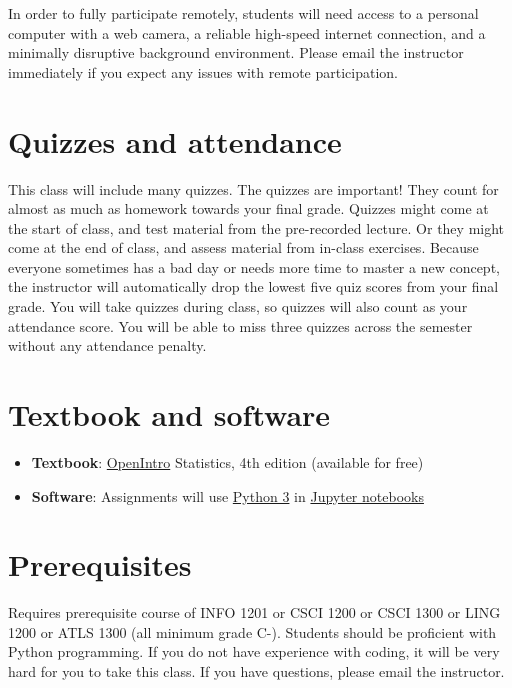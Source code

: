 \documentclass[10pt]{memoir}
\begin{document}
In order to fully participate remotely, students will need access to a personal computer with a web camera, a reliable high-speed internet connection, and a minimally disruptive background environment. Please email the instructor immediately if you expect any issues with remote participation.

\section{\textbf{Quizzes and attendance}}

This class will include many quizzes. The quizzes are important! They count for almost as much as homework towards your final grade. Quizzes might come at the start of class, and test material from the pre-recorded lecture. Or they might come at the end of class, and assess material from in-class exercises. Because everyone sometimes has a bad day or needs more time to master a new concept, the instructor will automatically drop the lowest five quiz scores from your final grade. You will take quizzes during class, so quizzes will also count as your attendance score. You will be able to miss three quizzes across the semester without any attendance penalty. 

\section{\textbf{Textbook and software }}

\begin{itemize}
\item \textbf{Textbook}: \href{https://www.abehandler.com/resources/openintro-statistics.pdf}{OpenIntro} Statistics, 4th edition (available for free)
\item \textbf{Software}: Assignments will use \href{https://www.python.org/}{Python 3} in \href{https://jupyter.org/}{Jupyter notebooks}
\end{itemize}

\section{\textbf{Prerequisites}}

Requires prerequisite course of INFO 1201 or CSCI 1200 or CSCI 1300 or LING 1200 or ATLS 1300 (all minimum grade C-). Students should be proficient with Python programming. If you do not have experience with coding, it will be very hard for you to take this class. If you have questions, please email the instructor.
\end{document}
